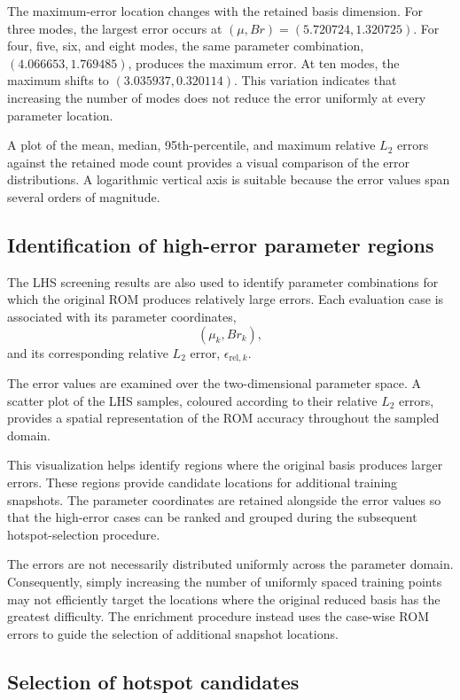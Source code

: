The maximum-error location changes with the retained
basis dimension. For three modes, the largest error
occurs at $(\mu,Br)=(5.720724,1.320725)$. For four,
five, six, and eight modes, the same parameter
combination, $(4.066653,1.769485)$, produces the
maximum error. At ten modes, the maximum shifts to
$(3.035937,0.320114)$. This variation indicates that
increasing the number of modes does not reduce the
error uniformly at every parameter location.

A plot of the mean, median, 95th-percentile, and maximum
relative $L_2$ errors against the retained mode count
provides a visual comparison of the error distributions.
A logarithmic vertical axis is suitable because the
error values span several orders of magnitude.

\subsection{Identification of high-error parameter regions}

The LHS screening results are also used to identify
parameter combinations for which the original ROM
produces relatively large errors. Each evaluation case
is associated with its parameter coordinates,
\[
(\mu_k,Br_k),
\]
and its corresponding relative $L_2$ error,
$\epsilon_{\mathrm{rel},k}$.

The error values are examined over the two-dimensional
parameter space. A scatter plot of the LHS samples,
coloured according to their relative $L_2$ errors,
provides a spatial representation of the ROM accuracy
throughout the sampled domain.

This visualization helps identify regions where the
original basis produces larger errors. These regions
provide candidate locations for additional training
snapshots. The parameter coordinates are retained
alongside the error values so that the high-error
cases can be ranked and grouped during the subsequent
hotspot-selection procedure.

The errors are not necessarily distributed uniformly
across the parameter domain. Consequently, simply
increasing the number of uniformly spaced training
points may not efficiently target the locations where
the original reduced basis has the greatest difficulty.
The enrichment procedure instead uses the case-wise
ROM errors to guide the selection of additional
snapshot locations.

\subsection{Selection of hotspot candidates}

